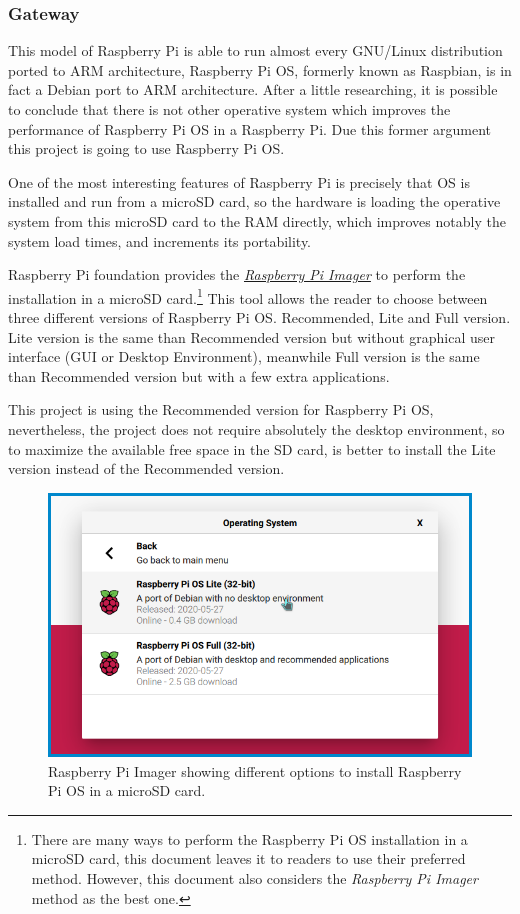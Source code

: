 \documentclass[11pt,a4paper,dvipsnames,twoside]{article}
\newcounter{subsubsubsection}[subsubsection]
\begin{document}
\subsubsection{Gateway}

This model of Raspberry Pi is able to run almost every GNU/Linux distribution ported to ARM architecture, Raspberry Pi OS, formerly known as Raspbian,\cite{RaspberryPiOs} is in fact a Debian port to ARM architecture. After a little researching, it is possible to conclude that there is not other operative system which improves the performance of Raspberry Pi OS in a Raspberry Pi. Due this former argument this project is going to use Raspberry Pi OS. 

One of the most interesting features of Raspberry Pi is precisely that OS is installed and run from a microSD card, so the hardware is loading the operative system from this microSD card to the RAM directly, which improves notably the system load times, and increments its portability.

Raspberry Pi foundation provides the \href{https://www.raspberrypi.org/downloads/noobs/}{\textit{Raspberry Pi Imager}} to perform the installation in a microSD card.\footnote{There are many ways to perform the Raspberry Pi OS installation in a microSD card, this document leaves it to readers to use their preferred method. However, this document also considers the \textit{Raspberry Pi Imager} method as the best one.} This tool allows the reader to choose between three different versions of Raspberry Pi OS. Recommended, Lite and Full version. Lite version is the same than Recommended version but without graphical user interface (GUI or Desktop Environment), meanwhile Full version is the same than Recommended version but with a few extra applications. 

This project is using the Recommended version for Raspberry Pi OS, nevertheless, the project does not require absolutely the desktop environment, so to maximize the available free space in the SD card, is better to install the Lite version instead of the Recommended version. 

\begin{figure}[htp]
  \centering
  \includegraphics[width=.7\textwidth]{../../pictures/rpi_imager.png}
  \caption{Raspberry Pi Imager showing different options to install Raspberry Pi OS in a microSD card.}
  \label{fig:RpiImager}
\end{figure}
\end{document}
